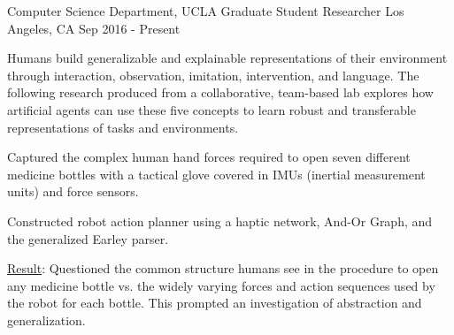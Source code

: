 


\begin{cventries}



\cventry
{Computer Science Department, UCLA}
{Graduate Student Researcher}
{Los Angeles, CA}
{Sep 2016 - Present}
{
\begin{justify}
Humans build generalizable and explainable representations of their environment through interaction, observation, imitation, intervention, and language. The following research produced from a collaborative, team-based lab explores how artificial agents can use these five concepts to learn robust and transferable representations of tasks and environments.
\end{justify}
%
\begin{justify}
\end{justify}
\vspace{-1mm}
\begin{cvitems}
  \item Captured the complex human hand forces required to open seven different medicine bottles with a tactical glove covered in IMUs (inertial measurement units) and force sensors.
  \item Constructed robot action planner using a haptic network, And-Or Graph, and the generalized Earley parser.
  \item \underline{Result}: Questioned the common structure humans see in the procedure to open any medicine bottle vs. the widely varying forces and action sequences used by the robot for each bottle. This prompted an investigation of abstraction and generalization.
\end{cvitems}
%
\begin{justify}

\end{justify}}
\end{cventries}
